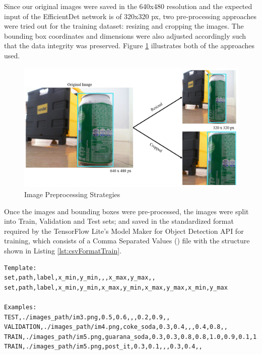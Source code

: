 \documentclass[openright]{normas-utf-tex} %
\begin{document}
Since our original images were saved in the 640x480 resolution and the expected
input of the EfficientDet network is of 320x320 px, two pre-processing
approaches were tried out for the training dataset: resizing and cropping the
images. The bounding box coordinates and dimensions were also adjusted
accordingly such that the data integrity was preserved. Figure
\ref{fig:preprocess} illustrates both of the approaches used.

\begin{figure}[H]
	\centering
	\includegraphics[width=1\textwidth]{./images/image_preprocessing.png}
	\caption[Image Preprocessing Strategies]{Image Preprocessing Strategies}
    \label{fig:preprocess}
\end{figure}

Once the images and bounding boxes were pre-processed, the images were split
into Train, Validation and Test sets; and saved in the standardized format
required by the TensorFlow Lite's Model Maker for Object Detection API for
training, which consists of a Comma Separated Values () file with the structure shown in Listing \ref{lst:csvFormatTrain}.

\begin{lstlisting}[caption={CSV format for specifying the Train, Test and Validation 
	image sets for training models using the TensorFlow's Model Maker API for Object 
	Detection},label={lst:csvFormatTrain}]
Template:
set,path,label,x_min,y_min,,,x_max,y_max,,
set,path,label,x_min,y_min,x_max,y_min,x_max,y_max,x_min,y_max

Examples:
TEST,./images_path/im3.png,0.5,0.6,,,0.2,0.9,,
VALIDATION,./images_path/im4.png,coke_soda,0.3,0.4,,,0.4,0.8,,
TRAIN,./images_path/im5.png,guarana_soda,0.3,0.3,0.8,0.8,1.0,0.9,0.1,1.0
TRAIN,./images_path/im5.png,post_it,0.3,0.1,,,0.3,0.4,,
\end{lstlisting}
\end{document}
